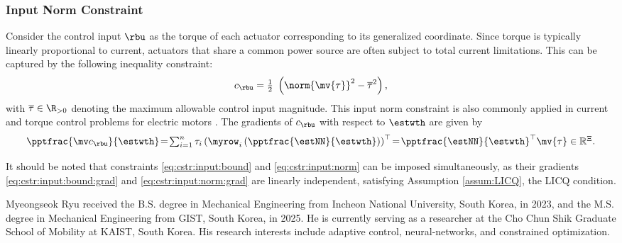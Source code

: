 \documentclass[journal]{IEEEtran}
\newcommand*{\template}{template}
\begin{document}
\subsubsection{Input Norm Constraint}\label{sec:appen:cstr:input:norm}

Consider the control input $\rbu$ as the torque of each actuator corresponding to its generalized coordinate. 
Since torque is typically linearly proportional to current, actuators that share a common power source are often subject to total current limitations. This can be captured by the following inequality constraint: 
\begin{equation}
    c_{\rbu}
    =
    \tfrac{1}{2}\
    \left(
        \norm{
        \mv{\tau}
        }^2 
        -
        \overline\tau^2
    \right)
    ,
    \label{eq:cstr:input:norm}
\end{equation}
with $\overline\tau\in\R_{>0}$ denoting the maximum allowable control input magnitude. This input norm constraint is also commonly applied in current and torque control problems for electric motors \cite{Choi:2024aa}.
The gradients of $c_{\rbu}$ with respect to $\estwth$ are given by
\begin{equation}
    \pptfrac{\mv c_{\rbu}}{\estwth}
    \!=\! 
    \textstyle\sum_{i=1}^n \tau_{i} 
    \left(
        \myrow_i
        \left(
            \pptfrac{\estNN}{\estwth}
        \right)
    \right)^\top  
    \!=\! 
    {\pptfrac{\estNN}{\estwth}}^\top
    \mv{\tau}
    \in \mathbb R^{\Xi}.
    \label{eq:cstr:input:norm:grad}
\end{equation}

\hfill

It should be noted that constraints \eqref{eq:cstr:input:bound} and \eqref{eq:cstr:input:norm} can be imposed simultaneously, as their gradients \eqref{eq:cstr:input:bound:grad} and \eqref{eq:cstr:input:norm:grad} are linearly independent, satisfying Assumption \ref{assum:LICQ}, \ie the LICQ condition.




\begin{IEEEbiography}{Myeongseok Ryu}
    received the B.S. degree in Mechanical Engineering from Incheon National University, South Korea, in 2023, and the M.S. degree in Mechanical Engineering from GIST, South Korea, in 2025. 
    He is currently serving as a researcher at the Cho Chun Shik Graduate School of Mobility at KAIST, South Korea.
    His research interests include adaptive control, neural-networks, and constrained optimization.
\end{IEEEbiography}
\end{document}

